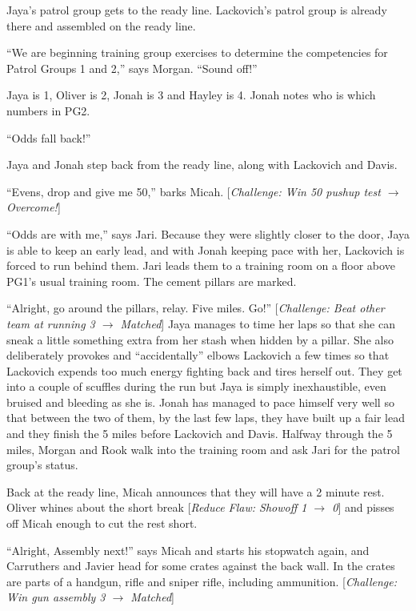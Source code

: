 Jaya's patrol group gets to the ready line.  Lackovich's patrol group is already there and assembled on the ready line. 



``We are beginning training group exercises to determine the competencies for Patrol Groups 1 and 2,'' says Morgan. ``Sound off!''

Jaya is 1, Oliver is 2, Jonah is 3 and Hayley is 4.  Jonah notes who is which numbers in PG2.

``Odds fall back!''

Jaya and Jonah step back from the ready line, along with Lackovich and Davis.

``Evens, drop and give me 50,'' barks Micah.  {[}\textit{Challenge: Win 50 pushup test $\rightarrow$ Overcome!}{]}



``Odds are with me,'' says Jari.  Because they were slightly closer to the door, Jaya is able to keep an early lead, and with Jonah keeping pace with her, Lackovich is forced to run behind them.  Jari leads them to a training room on a floor above PG1's usual training room.  The cement pillars are marked.  



``Alright, go around the pillars, relay.  Five miles.  Go!''  {[}\textit{Challenge: Beat other team at running 3 $\rightarrow$ Matched}{]}  Jaya manages to time her laps so that she can sneak a little something extra from her stash when hidden by a pillar.  She also deliberately provokes and ``accidentally'' elbows Lackovich a few times so that Lackovich expends too much energy fighting back and tires herself out.   They get into a couple of scuffles during the run but Jaya is simply inexhaustible, even bruised and bleeding as she is.  Jonah has managed to pace himself very well so that between the two of them, by the last few laps, they have built up a fair lead and they finish the 5 miles before Lackovich and Davis.  Halfway through the 5 miles, Morgan and Rook walk into the training room and ask Jari for the patrol group's status.



Back at the ready line, Micah announces that they will have a 2 minute rest.  Oliver whines about the short break {[}\textit{Reduce Flaw: Showoff 1 $\rightarrow$ 0}{]} and pisses off Micah enough to cut the rest short.



``Alright, Assembly next!'' says Micah and starts his stopwatch again, and Carruthers and Javier head for some crates against the back wall.  In the crates are parts of a handgun, rifle and sniper rifle, including ammunition.  {[}\textit{Challenge: Win gun assembly 3 $\rightarrow$ Matched}{]}



